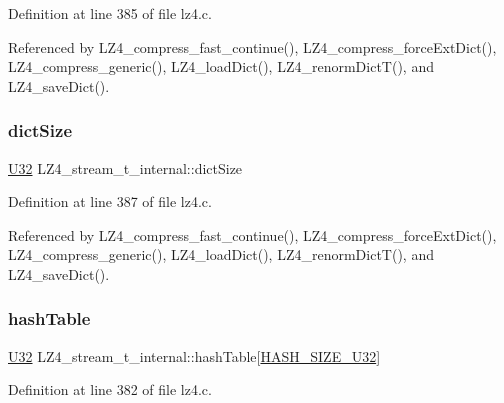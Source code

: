 Definition at line 385 of file lz4.\+c.



Referenced by L\+Z4\+\_\+compress\+\_\+fast\+\_\+continue(), L\+Z4\+\_\+compress\+\_\+force\+Ext\+Dict(), L\+Z4\+\_\+compress\+\_\+generic(), L\+Z4\+\_\+load\+Dict(), L\+Z4\+\_\+renorm\+Dict\+T(), and L\+Z4\+\_\+save\+Dict().

\mbox{\label{structLZ4__stream__t__internal_a39e9e581f2a3c904bb1a912fd1611e72}} 
\subsubsection{\texorpdfstring{dict\+Size}{dictSize}}
{\footnotesize\ttfamily \hyperlink{lz4_8c_ac3df7cf3c8cb172a588adec881447d68}{U32} L\+Z4\+\_\+stream\+\_\+t\+\_\+internal\+::dict\+Size}



Definition at line 387 of file lz4.\+c.



Referenced by L\+Z4\+\_\+compress\+\_\+fast\+\_\+continue(), L\+Z4\+\_\+compress\+\_\+force\+Ext\+Dict(), L\+Z4\+\_\+compress\+\_\+generic(), L\+Z4\+\_\+load\+Dict(), L\+Z4\+\_\+renorm\+Dict\+T(), and L\+Z4\+\_\+save\+Dict().

\mbox{\label{structLZ4__stream__t__internal_a81762be862caad87455554f2d39d4a29}} 
\subsubsection{\texorpdfstring{hash\+Table}{hashTable}}
{\footnotesize\ttfamily \hyperlink{lz4_8c_ac3df7cf3c8cb172a588adec881447d68}{U32} L\+Z4\+\_\+stream\+\_\+t\+\_\+internal\+::hash\+Table\mbox{[}\hyperlink{lz4_8c_a10355a0f2e4e7f206a362ffa2272ec22}{H\+A\+S\+H\+\_\+\+S\+I\+Z\+E\+\_\+\+U32}\mbox{]}}



Definition at line 382 of file lz4.\+c.



